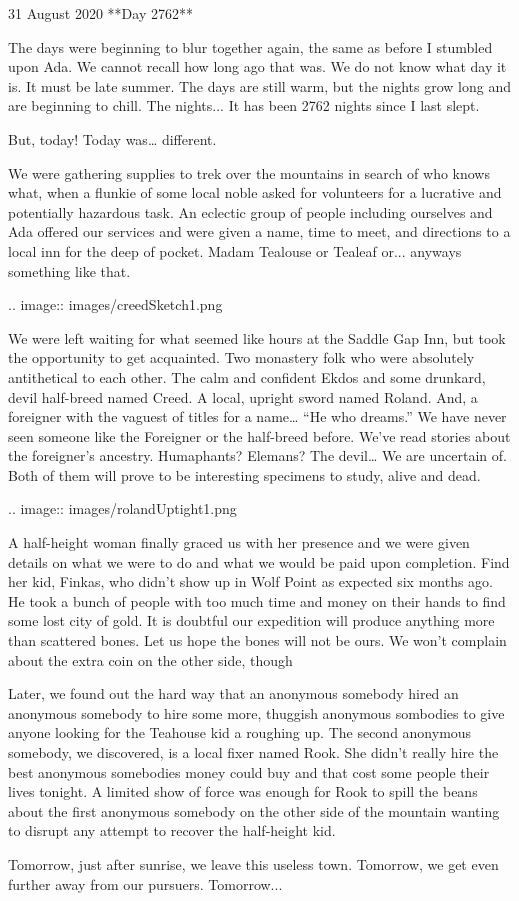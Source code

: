 31 August 2020
**Day 2762**


The days were beginning to blur together again, the same as before I stumbled upon Ada.  We cannot recall how long ago that was.  We do not know what day it is.  It must be late summer.  The days are still warm, but the nights grow long and are beginning to chill.  The nights... It has been 2762 nights since I last slept.

But, today!  Today was… different.

We were gathering supplies to trek over the mountains in search of who knows what, when a flunkie of some local noble asked for volunteers for a lucrative and potentially hazardous task.  An eclectic group of people including ourselves and Ada offered our services and were given a name, time to meet, and directions to a local inn for the deep of pocket.  Madam Tealouse or Tealeaf or...  anyways something like that.


.. image:: images/creedSketch1.png
		
We were left waiting for what seemed like hours at the Saddle Gap Inn, but took the opportunity to get acquainted.  Two monastery folk who were absolutely antithetical to each other. The calm and confident Ekdos and some drunkard, devil half-breed named Creed.  A local, upright sword named Roland. And, a foreigner with the vaguest of titles for a name… “He who dreams.”  We have never seen someone like the Foreigner or the half-breed before.  We’ve read stories about the foreigner’s ancestry. Humaphants? Elemans?  The devil… We are uncertain of.  Both of them will prove to be interesting specimens to study, alive and dead.


.. image:: images/rolandUptight1.png

A half-height woman finally graced us with her presence and we were given details on what we were to do and what we would be paid upon completion.  Find her kid, Finkas, who didn’t show up in Wolf Point as expected six months ago.  He took a bunch of people with too much time and money on their hands to find some lost city of gold.  It is doubtful our expedition will produce anything more than scattered bones.  Let us hope the bones will not be ours.  We won’t complain about the extra coin on the other side, though

Later, we found out the hard way that an anonymous somebody hired an anonymous somebody to hire some more, thuggish anonymous sombodies to give anyone looking for the Teahouse kid a roughing up.  The second anonymous somebody, we discovered, is a local fixer named Rook.  She didn’t really hire the best anonymous somebodies money could buy and that cost some people their lives tonight.  A limited show of force was enough for Rook to spill the beans about the first anonymous somebody on the other side of the mountain wanting to disrupt any attempt to recover the half-height kid.

Tomorrow, just after sunrise, we leave this useless town.  Tomorrow, we get even further away from our pursuers.  Tomorrow... 
